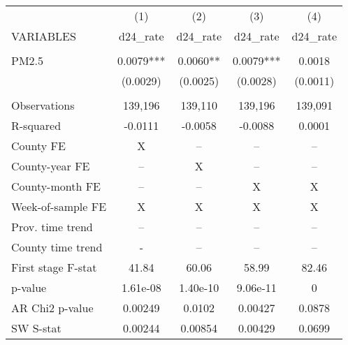 \begin{tabular}{lcccc} \hline
 & (1) & (2) & (3) & (4) \\
VARIABLES & d24\_rate & d24\_rate & d24\_rate & d24\_rate \\ \hline
 &  &  &  &  \\
PM2.5 & 0.0079*** & 0.0060** & 0.0079*** & 0.0018 \\
 & (0.0029) & (0.0025) & (0.0028) & (0.0011) \\
 &  &  &  &  \\
Observations & 139,196 & 139,110 & 139,196 & 139,091 \\
R-squared & -0.0111 & -0.0058 & -0.0088 & 0.0001 \\
County FE & X & -- & -- & -- \\
County-year FE & -- & X & -- & -- \\
County-month FE & -- & -- & X & X \\
Week-of-sample FE & X & X & X & X \\
Prov. time trend & -- & -- & -- & -- \\
County time trend & - & -- & -- & -- \\
First stage F-stat & 41.84 & 60.06 & 58.99 & 82.46 \\
p-value & 1.61e-08 & 1.40e-10 & 9.06e-11 & 0 \\
AR Chi2 p-value & 0.00249 & 0.0102 & 0.00427 & 0.0878 \\
 SW S-stat & 0.00244 & 0.00854 & 0.00429 & 0.0699 \\ \hline
\end{tabular}
